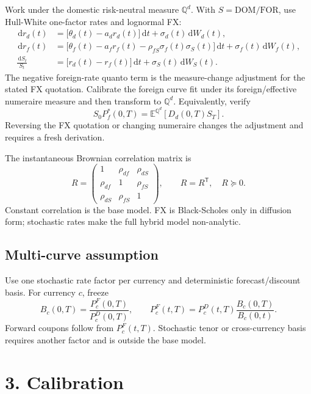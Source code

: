 \documentclass[9pt,letterpaper]{extarticle}
\newcommand{\Qd}{\mathbb{Q}^{d}}
\newcommand{\E}{\mathbb{E}}
\newcommand{\dd}{\,\mathrm{d}}
\newcommand{\DOM}{\ensuremath{\mathrm{DOM}}}
\newcommand{\FOR}{\ensuremath{\mathrm{FOR}}}
\begin{document}
Work under the domestic risk-neutral measure $\Qd$. With $S=\DOM/\FOR$, use Hull-White one-factor rates and lognormal FX:
\begin{align}
  \dd r_d(t) &= \bigl[\theta_d(t)-a_dr_d(t)\bigr]\dd t+\sigma_d(t)\dd W_d(t), \\
  \dd r_f(t) &= \bigl[\theta_f(t)-a_fr_f(t)-\rho_{fS}\sigma_f(t)\sigma_S(t)\bigr]\dd t
                 +\sigma_f(t)\dd W_f(t), \\
  \frac{\dd S_t}{S_t} &= \bigl[r_d(t)-r_f(t)\bigr]\dd t+\sigma_S(t)\dd W_S(t).
\end{align}
The negative foreign-rate quanto term is the measure-change adjustment for the stated FX quotation. Calibrate the foreign curve fit under its foreign/effective numeraire measure and then transform to $\Qd$. Equivalently, verify
\[
  S_0P_f^{*}(0,T)=\E^{\Qd}\!\left[D_d(0,T)S_T\right].
\]
Reversing the FX quotation or changing numeraire changes the adjustment and requires a fresh derivation.

The instantaneous Brownian correlation matrix is
\[
R=
\begin{pmatrix}
1 & \rho_{df} & \rho_{dS}\\
\rho_{df} & 1 & \rho_{fS}\\
\rho_{dS} & \rho_{fS} & 1
\end{pmatrix},
\qquad R=R^{\mathsf T},\quad R\succeq0.
\]
Constant correlation is the base model. FX is Black-Scholes only in diffusion form; stochastic rates make the full hybrid model non-analytic.

\subsection{Multi-curve assumption}

Use one stochastic rate factor per currency and deterministic forecast/discount basis. For currency $c$, freeze
\[
 B_c(0,T)=\frac{P_c^F(0,T)}{P_c^D(0,T)},
 \qquad
 P_c^F(t,T)=P_c^D(t,T)\frac{B_c(0,T)}{B_c(0,t)}.
\]
Forward coupons follow from $P_c^F(t,T)$. Stochastic tenor or cross-currency basis requires another factor and is outside the base model.

\newpage

\section{3. Calibration}
\end{document}

